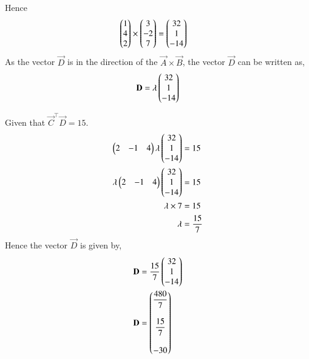 \documentclass[journal,12pt,twocolumn]{IEEEtran}
\begin{document}
\begin{enumerate}
Hence
\begin{align}
\begin{pmatrix}1\\4\\2\end{pmatrix} \times \begin{pmatrix}3\\-2\\7\end{pmatrix} &= \begin{pmatrix}32\\1\\-14\end{pmatrix}
\end{align}
As the vector $\vec{D}$ is in the direction of the $\vec{A} \times \vec{B}$, the vector $\vec{D}$ can be written as,
\begin{align}
\mathbf{D} = \lambda \begin{pmatrix}32\\1\\-14\end{pmatrix}
\end{align}

Given that $\vec{C}^{\top}\vec{D} = 15$.
\begin{align}
\begin{pmatrix}2&-1&4\end{pmatrix}\lambda\begin{pmatrix}32\\1\\-14\end{pmatrix} &= 15\\
\lambda\begin{pmatrix}2&-1&4\end{pmatrix}\begin{pmatrix}32\\1\\-14\end{pmatrix} &= 15\\
\lambda \times 7 &= 15\\
\lambda &= \dfrac{15}{7}
\end{align}
Hence the vector $\vec{D}$ is given by,
\begin{align}
\mathbf{D} &= \dfrac{15}{7}\begin{pmatrix}32\\1\\-14\end{pmatrix}\\
\mathbf{D} &= \begin{pmatrix}\dfrac{480}{7} \\\\ \dfrac{15}{7} \\\\ -30\end{pmatrix}
\end{align}

\end{enumerate}
\end{document}
